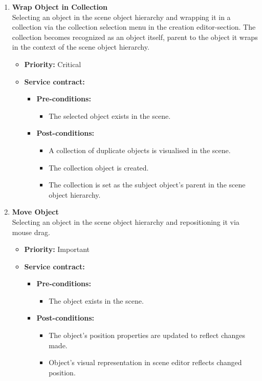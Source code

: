 \documentclass[a4paper,12pt]{article}
\begin{document}
\begin{enumerate}
			\item {\large \textbf{Wrap Object in Collection}}\\
			Selecting an object in the scene object hierarchy and wrapping it in a collection via the collection selection menu in the creation editor-section. The collection becomes recognized as an object itself, parent to the object it wraps in the context of the scene object hierarchy.
			\begin{itemize}
				\item \textbf{Priority:} Critical
				\item \textbf{Service contract:}
				\begin{itemize}
					\item \textbf{Pre-conditions:}
						\begin{itemize}
							\item The selected object exists in the scene.
						\end{itemize}
					\item \textbf{Post-conditions:}
						\begin{itemize}
							\item A collection of duplicate objects is visualised in the scene.
							\item The collection object is created.
							\item The collection is set as the subject object's parent in the scene object hierarchy.
						\end{itemize}
				\end{itemize}
			\end{itemize}
			
			\item {\large \textbf{Move Object}}\\
			Selecting an object in the scene object hierarchy and repositioning it via mouse drag.
			\begin{itemize}
				\item \textbf{Priority:} Important
				\item \textbf{Service contract:}
				\begin{itemize}
					\item \textbf{Pre-conditions:}
						\begin{itemize}
							\item The object exists in the scene.
						\end{itemize}
					\item \textbf{Post-conditions:}
						\begin{itemize}
							\item The object's position properties are updated to reflect changes made.
							\item Object's visual representation in scene editor reflects changed position.
						\end{itemize}
				\end{itemize}
			\end{itemize}
			

\end{enumerate}
\end{document}
